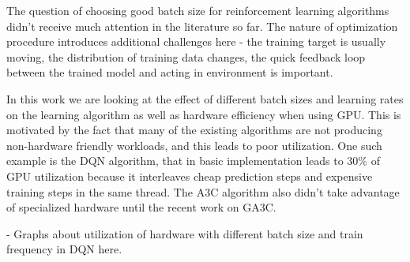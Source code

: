 The question of choosing good batch size for reinforcement learning algorithms didn't receive
much attention in the literature so far. The nature of optimization procedure introduces additional
challenges here - the training target is usually moving, the distribution of training data changes,
the quick feedback loop between the trained model and acting in environment is important.

In this work we are looking at the effect of different batch sizes and learning rates on the
learning algorithm as well as hardware efficiency when using GPU. This is motivated by the fact
that many of the existing algorithms are not producing non-hardware friendly workloads, and this
leads to poor utilization. One such example is the DQN algorithm, that in basic implementation
leads to 30\% of GPU utilization because it interleaves cheap prediction steps and expensive
training steps in the same thread. The A3C algorithm also didn't take advantage of specialized
hardware until the recent work on GA3C.

- Graphs about utilization of hardware with
different batch size and train frequency in DQN here.
